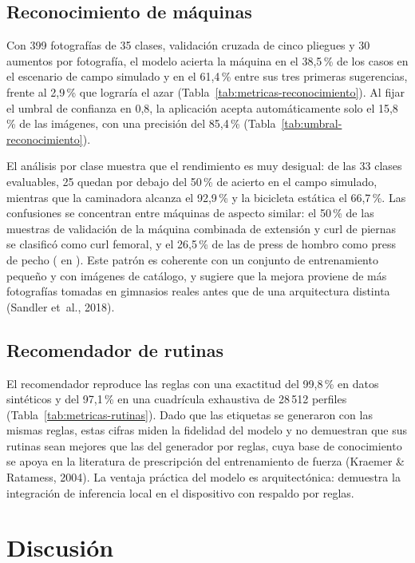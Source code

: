 \subsection{Reconocimiento de máquinas}

Con 399 fotografías de 35 clases, validación cruzada de cinco pliegues y 30
aumentos por fotografía, el modelo acierta la máquina en el 38,5\,\% de los
casos en el escenario de campo simulado y en el 61,4\,\% entre sus tres
primeras sugerencias, frente al 2,9\,\% que lograría el azar
(Tabla~\ref{tab:metricas-reconocimiento}). Al fijar el umbral de confianza en
0,8, la aplicación acepta automáticamente solo el 15,8\,\% de las imágenes, con
una precisión del 85,4\,\% (Tabla~\ref{tab:umbral-reconocimiento}).

El análisis por clase muestra que el rendimiento es muy desigual: de las 33
clases evaluables, 25 quedan por debajo del 50\,\% de acierto en el campo
simulado, mientras que la caminadora alcanza el 92,9\,\% y la bicicleta
estática el 66,7\,\%. Las confusiones se concentran entre máquinas de aspecto
similar: el 50\,\% de las muestras de validación de la máquina combinada de
extensión y curl de piernas se clasificó como curl femoral, y el 26,5\,\% de
las de press de hombro como press de pecho
( en
). Este patrón es coherente con un conjunto
de entrenamiento pequeño y con imágenes de catálogo, y sugiere que la mejora
proviene de más fotografías tomadas en gimnasios reales antes que de una
arquitectura distinta (Sandler et~al., 2018).

\subsection{Recomendador de rutinas}

El recomendador reproduce las reglas con una exactitud del 99,8\,\% en datos
sintéticos y del 97,1\,\% en una cuadrícula exhaustiva de 28\,512 perfiles
(Tabla~\ref{tab:metricas-rutinas}). Dado que las etiquetas se generaron con las
mismas reglas, estas cifras miden la fidelidad del modelo y no demuestran que
sus rutinas sean mejores que las del generador por reglas, cuya base de
conocimiento se apoya en la literatura de prescripción del entrenamiento de
fuerza (Kraemer \& Ratamess, 2004). La ventaja práctica del modelo es
arquitectónica: demuestra la integración de inferencia local en el
dispositivo con respaldo por reglas.

\section{Discusión}
\label{sec:discusion}

